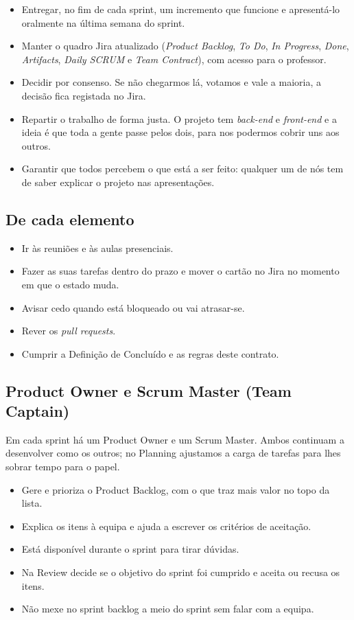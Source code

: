 \documentclass[11pt,a4paper]{article}
\begin{document}
\begin{itemize}
  \item Entregar, no fim de cada sprint, um incremento que funcione e apresentá-lo oralmente na última semana do sprint.
  \item Manter o quadro Jira atualizado (\textit{Product Backlog}, \textit{To Do}, \textit{In Progress}, \textit{Done}, \textit{Artifacts}, \textit{Daily SCRUM} e \textit{Team Contract}), com acesso para o professor.
  \item Decidir por consenso. Se não chegarmos lá, votamos e vale a maioria, a decisão fica registada no Jira.
  \item Repartir o trabalho de forma justa. O projeto tem \textit{back-end} e \textit{front-end} e a ideia é que toda a gente passe pelos dois, para nos podermos cobrir uns aos outros.
  \item Garantir que todos percebem o que está a ser feito: qualquer um de nós tem de saber explicar o projeto nas apresentações.
\end{itemize}

\subsection{De cada elemento}

\begin{itemize}
  \item Ir às reuniões e às aulas presenciais.
  \item Fazer as suas tarefas dentro do prazo e mover o cartão no Jira no momento em que o estado muda.
  \item Avisar cedo quando está bloqueado ou vai atrasar-se.
  \item Rever os \textit{pull requests}.
  \item Cumprir a Definição de Concluído e as regras deste contrato.
\end{itemize}

\subsection{Product Owner e Scrum Master (Team Captain)}
Em cada sprint há um Product Owner e um Scrum Master. Ambos continuam a desenvolver como os outros; no Planning ajustamos a carga de tarefas para lhes sobrar tempo para o papel.

\begin{tcolorbox}[caixa, title={Product Owner}]
  \begin{itemize}
    \item Gere e prioriza o Product Backlog, com o que traz mais valor no topo da lista.
    \item Explica os itens à equipa e ajuda a escrever os critérios de aceitação.
    \item Está disponível durante o sprint para tirar dúvidas.
    \item Na Review decide se o objetivo do sprint foi cumprido e aceita ou recusa os itens.
    \item Não mexe no sprint backlog a meio do sprint sem falar com a equipa.
  \end{itemize}
\end{tcolorbox}
\end{document}
